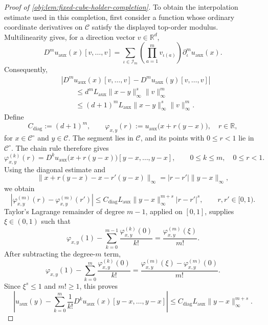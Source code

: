 \begin{proof}[Proof of \cref{obj:lem:fixed-cube-holder-completion}]
To obtain the interpolation estimate used in this completion, first consider a function whose ordinary coordinate derivatives on \(\mathscr C\) satisfy the displayed top-order modulus. Multilinearity gives, for a direction vector \(v\in\mathbb R^d\),
\[
D^m u_{\mathrm{aux}}(x)[v,\ldots,v]
=
\sum_{\iota\in\mathscr I_m}
\left(\prod_{a=1}^m v_{\iota(a)}\right)
\partial_\iota^m u_{\mathrm{aux}}(x).
\]
Consequently,
\[
\begin{aligned}
&|D^m u_{\mathrm{aux}}(x)[v,\ldots,v]
-D^m u_{\mathrm{aux}}(y)[v,\ldots,v]|\\
&\qquad\le
d^m L_{\mathrm{aux}}\|x-y\|_\infty^s\|v\|_\infty^m\\
&\qquad\le
(d+1)^m L_{\mathrm{aux}}\|x-y\|_\infty^s\|v\|_\infty^m.
\end{aligned}
\]
Define
\[
C_{\mathrm{diag}}:=(d+1)^m,\qquad
\varphi_{x,y}(r):=
u_{\mathrm{aux}}\bigl(x+r(y-x)\bigr),
\quad r\in\mathbb R,
\]
for \(x\in\mathscr C^\circ\) and \(y\in\mathscr C\).
The segment lies in \(\mathscr C\), and its points with \(0\le r<1\) lie in \(\mathscr C^\circ\). The chain rule therefore gives
\[
\varphi_{x,y}^{(k)}(r)
=
D^k u_{\mathrm{aux}}\bigl(x+r(y-x)\bigr)
[y-x,\ldots,y-x],
\qquad 0\le k\le m,\quad 0\le r<1.
\]
Using the diagonal estimate and
\[
\|x+r(y-x)-x-r'(y-x)\|_\infty
=
|r-r'|\|y-x\|_\infty,
\]
we obtain
\[
|\varphi_{x,y}^{(m)}(r)-\varphi_{x,y}^{(m)}(r')|
\le
C_{\mathrm{diag}}L_{\mathrm{aux}}
\|y-x\|_\infty^{m+s}|r-r'|^s,
\qquad r,r'\in[0,1).
\]
Taylor's Lagrange remainder of degree \(m-1\), applied on \([0,1]\), supplies \(\xi\in(0,1)\) such that
\[
\varphi_{x,y}(1)
-\sum_{k=0}^{m-1}\frac{\varphi_{x,y}^{(k)}(0)}{k!}
=
\frac{\varphi_{x,y}^{(m)}(\xi)}{m!}.
\]
After subtracting the degree-\(m\) term,
\[
\varphi_{x,y}(1)
-\sum_{k=0}^{m}\frac{\varphi_{x,y}^{(k)}(0)}{k!}
=
\frac{\varphi_{x,y}^{(m)}(\xi)
-\varphi_{x,y}^{(m)}(0)}{m!}.
\]
Since \(\xi^s\le1\) and \(m!\ge1\), this proves
\[
\left|
u_{\mathrm{aux}}(y)
-\sum_{k=0}^{m}\frac{1}{k!}
D^k u_{\mathrm{aux}}(x)[y-x,\ldots,y-x]
\right|
\le
C_{\mathrm{diag}}L_{\mathrm{aux}}
\|y-x\|_\infty^{m+s}.
\]


\end{proof}
